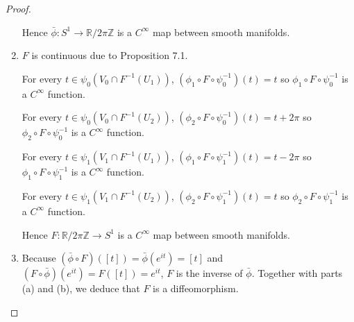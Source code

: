 \begin{proof}
\begin{enumerate}[label={(\alph*)},leftmargin=*]
              Hence \( \bar{\phi}: S^{1} \to \mathbb{R}/2\pi\mathbb{Z} \) is a \( C^{\infty} \) map between smooth manifolds.
        \item \( F \) is continuous due to Proposition 7.1.

              For every \( t \in \psi_{0}(V_{0} \cap F^{-1}(U_{1})) \), \( (\phi_{1} \circ F \circ \psi_{0}^{-1})(t) = t \) so \( \phi_{1} \circ F \circ \psi_{0}^{-1} \) is a \( C^{\infty} \) function.

              For every \( t \in \psi_{0}(V_{0} \cap F^{-1}(U_{2})) \), \( (\phi_{2} \circ F \circ \psi_{0}^{-1})(t) = t + 2\pi \) so \( \phi_{2} \circ F \circ \psi_{0}^{-1} \) is a \( C^{\infty} \) function.

              For every \( t \in \psi_{1}(V_{1} \cap F^{-1}(U_{1})) \), \( (\phi_{1} \circ F \circ \psi_{1}^{-1})(t) = t - 2\pi \) so \( \phi_{1} \circ F \circ \psi_{1}^{-1} \) is a \( C^{\infty} \) function.

              For every \( t \in \psi_{1}(V_{1} \cap F^{-1}(U_{2})) \), \( (\phi_{2} \circ F \circ \psi_{1}^{-1})(t) = t \) so \( \phi_{2} \circ F \circ \psi_{1}^{-1} \) is a \( C^{\infty} \) function.

              Hence \( F: \mathbb{R}/2\pi\mathbb{Z} \to S^{1} \) is a \( C^{\infty} \) map between smooth manifolds.
        \item Because \( (\bar{\phi} \circ F)([t]) = \bar{\phi}(e^{it}) = [t] \) and \( (F\circ \bar{\phi})(e^{it}) = F([t]) = e^{it} \), \( F \) is the inverse of \( \bar{\phi} \). Together with parts (a) and (b), we deduce that \( F \) is a diffeomorphism.
    \end{enumerate}
\end{proof}

